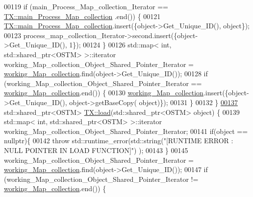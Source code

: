 \begin{DoxyCode}
00119     \textcolor{keywordflow}{if} (main\_Process\_Map\_collection\_Iterator == \hyperlink{class_t_x_a1a45d726894190695314464d7cd97c29_a1a45d726894190695314464d7cd97c29}{TX::main\_Process\_Map\_collection}
      .end()) \{
00121         \hyperlink{class_t_x_a1a45d726894190695314464d7cd97c29_a1a45d726894190695314464d7cd97c29}{TX::main\_Process\_Map\_collection}.insert(\{\textcolor{keywordtype}{object}->Get\_Unique\_ID(), \textcolor{keywordtype}{
      object}\});
00123         process\_map\_collection\_Iterator->second.insert(\{\textcolor{keywordtype}{object}->Get\_Unique\_ID(), 1\});
00124     \} 
00126     std::map< int, std::shared\_ptr<OSTM> >::iterator working\_Map\_collection\_Object\_Shared\_Pointer\_Iterator 
      = \hyperlink{class_t_x_a81aafda16e2f20e36ec6c68e584668ff_a81aafda16e2f20e36ec6c68e584668ff}{working\_Map\_collection}.find(object->Get\_Unique\_ID());
00128     \textcolor{keywordflow}{if} (working\_Map\_collection\_Object\_Shared\_Pointer\_Iterator == 
      \hyperlink{class_t_x_a81aafda16e2f20e36ec6c68e584668ff_a81aafda16e2f20e36ec6c68e584668ff}{working\_Map\_collection}.end()) \{
00130         \hyperlink{class_t_x_a81aafda16e2f20e36ec6c68e584668ff_a81aafda16e2f20e36ec6c68e584668ff}{working\_Map\_collection}.insert(\{\textcolor{keywordtype}{object}->Get\_Unique\_ID(), \textcolor{keywordtype}{object}->getBaseCopy(\textcolor{keywordtype}{
      object})\});
00131     \}
00132 \}
\hypertarget{_t_x_8cpp_source.tex_l00137}{}\hyperlink{class_t_x_a1d78262b8831ddd042ed491f2e600e24_a1d78262b8831ddd042ed491f2e600e24}{00137} std::shared\_ptr<OSTM> \hyperlink{class_t_x_a1d78262b8831ddd042ed491f2e600e24_a1d78262b8831ddd042ed491f2e600e24}{TX::load}(std::shared\_ptr<OSTM> \textcolor{keywordtype}{object}) \{
00139     std::map< int, std::shared\_ptr<OSTM> >::iterator working\_Map\_collection\_Object\_Shared\_Pointer\_Iterator;
00141     \textcolor{keywordflow}{if}(\textcolor{keywordtype}{object} == \textcolor{keyword}{nullptr})\{
00142         \textcolor{keywordflow}{throw} std::runtime\_error(std::string(\textcolor{stringliteral}{"[RUNTIME ERROR : NULL POINTER IN LOAD FUNCTION]"}) );
00143     \}
00145     working\_Map\_collection\_Object\_Shared\_Pointer\_Iterator = 
      \hyperlink{class_t_x_a81aafda16e2f20e36ec6c68e584668ff_a81aafda16e2f20e36ec6c68e584668ff}{working\_Map\_collection}.find(object->Get\_Unique\_ID());
00147     \textcolor{keywordflow}{if} (working\_Map\_collection\_Object\_Shared\_Pointer\_Iterator != 
      \hyperlink{class_t_x_a81aafda16e2f20e36ec6c68e584668ff_a81aafda16e2f20e36ec6c68e584668ff}{working\_Map\_collection}.end()) \{

\end{DoxyCode}
